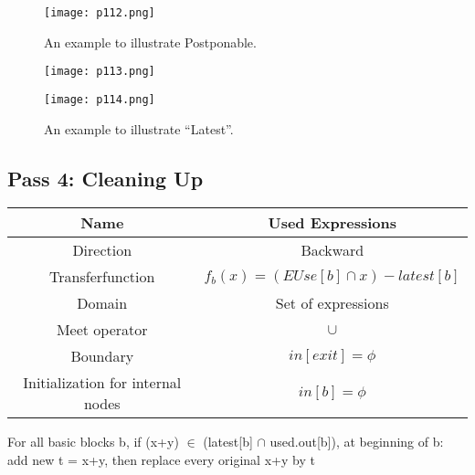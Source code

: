        \begin{figure}[H]
        \centering
         \texttt{[image: p112.png]}
             \caption{An example to illustrate Postponable.}
             \label{fig:p112}
    \end{figure}

    \begin{figure}[H]
        \centering
         \texttt{[image: p113.png]}
             \label{fig:p113}
    \end{figure}



    \begin{figure}[H]
        \centering
         \texttt{[image: p114.png]}
         \caption{An example to illustrate “Latest”.}
             \label{fig:p114}
    \end{figure}

\subsection{Pass 4: Cleaning Up}



\begin{center}
    \begin{tabular}{|c|c|}
   \hline Name & Used Expressions\\    
   \hline Direction & Backward\\
   \hline Transferfunction  & \( f_b (x) = (EUse[b] \cap x) - latest[b] \)\\
   \hline Domain & Set of expressions\\
   \hline Meet operator & \( \cup \)\\
   \hline Boundary & $in[exit] = \phi$ \\  
   \hline Initialization for internal nodes & \( in[b] = \phi \)  \\
   \hline
   \end{tabular}  
   \end{center}


   For all basic blocks b, if (x+y) $\in$ (latest[b] $\cap$ used.out[b]), at beginning of b:
   add new t = x+y, then replace every original x+y by t






